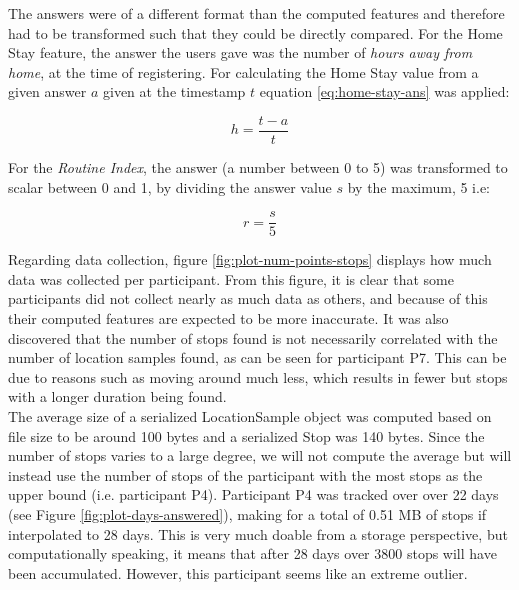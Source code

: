 The answers were of a different format than the computed features and therefore had to be transformed such that they could be directly compared. For the Home Stay feature, the answer the users gave was the number of \textit{hours away from home}, at the time of registering. For calculating the Home Stay value from a given answer $a$ given at the timestamp $t$ equation \ref{eq:home-stay-ans} was applied:

\begin{equation}
\label{eq:home-stay-ans}
    h = \frac{t - a }{t}
\end{equation}

For the \textit{Routine Index}, the answer (a number between 0 to 5) was transformed to scalar between 0 and 1, by dividing the answer value $s$ by the maximum, 5 i.e:

\begin{equation}
\label{eq:routine-ans}
    r = \frac{s}{5}
\end{equation}

Regarding data collection, figure \ref{fig:plot-num-points-stops} displays how much data was collected per participant. From this figure, it is clear that some participants did not collect nearly as much data as others, and because of this their computed features are expected to be more inaccurate. It was also discovered that the number of stops found is not necessarily correlated with the number of location samples found, as can be seen for participant P7. This can be due to reasons such as moving around much less, which results in fewer but stops with a longer duration being found.\\

The average size of a serialized LocationSample object was computed based on file size to be around 100 bytes and a serialized Stop was 140 bytes. Since the number of stops varies to a large degree, we will not compute the average but will instead use the number of stops of the participant with the most stops as the upper bound (i.e. participant P4). Participant P4 was tracked over over 22 days (see Figure \ref{fig:plot-days-answered}), making for a total of 0.51 MB of stops if interpolated to 28 days. This is very much doable from a storage perspective, but computationally speaking, it means that after 28 days over 3800 stops will have been accumulated. However, this participant seems like an extreme outlier.\\

